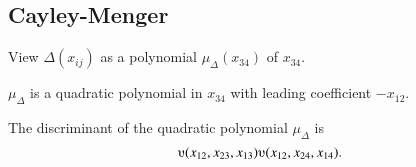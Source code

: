 \begin{tarskidata}
%
%










\begin{tarski}
\section{Cayley-Menger}

View $\Delta(x_{ij})$ as a polynomial $\mu_\Delta(x_{34})$ of $x_{34}$.

\begin{lemma} 
$\mu_\Delta$  is a quadratic
polynomial in $x_{34}$ with leading coefficient $-x_{12}$. 
\end{lemma}

\begin{proved}
\swallowed\end{proved}
\end{tarski}



\begin{tarski}

\begin{lemma}
The discriminant of the quadratic polynomial $\mu_\Delta$ is
	$$
	\ups(x_{12},x_{23},x_{13}) \ups(x_{12},x_{24},x_{14}).
	$$
\end{lemma}

\begin{proved}
\swallowed\end{proved}
\end{tarski}





\end{tarskidata}
